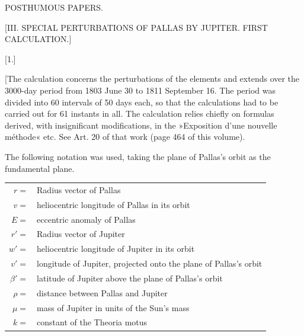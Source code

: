 \clearpage
{}
\begin{center}
{\Large POSTHUMOUS PAPERS.\par}
\bigskip
{\large [III. SPECIAL PERTURBATIONS OF PALLAS BY JUPITER. FIRST CALCULATION.]\par}
\end{center}
\par{}\bigskip
{}
\begin{center}[1.]\end{center}
\begingroup
\makeatletter\tagsleft@true\let\veqno\@@leqno\makeatother
\setlength{\lineskip}{4pt}\setlength{\lineskiplimit}{4pt}
\noindent\hspace*{\parindent}[The calculation concerns the perturbations of the elements and extends over the 3000-day period from 1803 June 30 to 1811 September 16. The period was divided into 60 intervals of 50 days each, so that the calculations had to be carried out for 61 instants in all. The calculation relies chiefly on formulas derived, with insignificant modifications, in the »Exposition d’une nouvelle méthode« etc. See Art. 20 of that work (page 464 of this volume).
\par
The following notation was used, taking the plane of Pallas’s orbit as the fundamental plane.
\begin{center}
\begin{tabular}{@{}r@{\ }p{.86\linewidth}@{}}
\(r={}\)&Radius vector of Pallas\\
\(v={}\)&heliocentric longitude of Pallas in its orbit\\
\(E={}\)&eccentric anomaly of Pallas\\
\(r'={}\)&Radius vector of Jupiter\\
\(w'={}\)&heliocentric longitude of Jupiter in its orbit\\
\(v'={}\)&longitude of Jupiter, projected onto the plane of Pallas’s orbit\\
\(\beta'={}\)&latitude of Jupiter above the plane of Pallas’s orbit\\
\(\rho={}\)&distance between Pallas and Jupiter\\
\(\mu={}\)&mass of Jupiter in units of the Sun’s mass\\
\(k={}\)&constant of the Theoria motus
\end{tabular}
\end{center}
